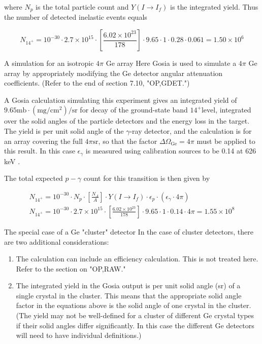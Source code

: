 \documentclass[10pt]{article}
\begin{document}
where $N_{p}$ is the total particle count and $Y\left(I \rightarrow I_{f}\right)$ is the integrated yield. Thus the number of detected inelastic events equals


\begin{equation*}
N_{14^{+}}=10^{-30} \cdot 2.7 \times 10^{15} \cdot\left[\frac{6.02 \times 10^{23}}{178}\right] \cdot 9.65 \cdot 1 \cdot 0.28 \cdot 0.061=1.50 \times 10^{6} \tag{6.67}
\end{equation*}


A simulation for an isotropic $4 \pi$ Ge array Here Gosia is used to simulate a $4 \pi$ Ge array by appropriately modifying the Ge detector angular attenuation coefficients. (Refer to the end of section 7.10, "OP,GDET.")

A Gosia calculation simulating this experiment gives an integrated yield of $9.65 \mathrm{mb} \cdot\left(\mathrm{mg} / \mathrm{cm}^{2}\right) / \mathrm{sr}$ for decay of the ground-state band $14^{+}$level, integrated over the solid angles of the particle detectors and the energy loss in the target. The yield is per unit solid angle of the $\gamma$-ray detector, and the calculation is for an array covering the full $4 \pi \mathrm{sr}$, so that the factor $\Delta \Omega_{\mathrm{Ge}}=4 \pi$ must be applied to this result. In this case $\epsilon_{\gamma}$ is measured using calibration sources to be 0.14 at 626 keV .

The total expected $p-\gamma$ count for this transition is then given by


\begin{gather*}
N_{14^{+}}=10^{-30} \cdot N_{p} \cdot\left[\frac{N_{A}}{A}\right] \cdot Y\left(I \rightarrow I_{f}\right) \cdot \epsilon_{p} \cdot\left(\epsilon_{\gamma} \cdot 4 \pi\right)  \tag{6.68}\\
N_{14^{+}}=10^{-30} \cdot 2.7 \times 10^{15} \cdot\left[\frac{6.02 \times 10^{23}}{178}\right] \cdot 9.65 \cdot 1 \cdot 0.14 \cdot 4 \pi=1.55 \times 10^{8} \tag{6.69}
\end{gather*}


The special case of a Ge "cluster" detector In the case of cluster detectors, there are two additional considerations:

\begin{enumerate}
  \item The calculation can include an efficiency calculation. This is not treated here. Refer to the section on "OP,RAW."
  \item The integrated yield in the Gosia output is per unit solid angle (sr) of a single crystal in the cluster. This means that the appropriate solid angle factor in the equations above is the solid angle of one crystal in the cluster. (The yield may not be well-defined for a cluster of different Ge crystal types if their solid angles differ significantly. In this case the different Ge detectors will need to have individual definitions.)
\end{enumerate}
\end{document}
